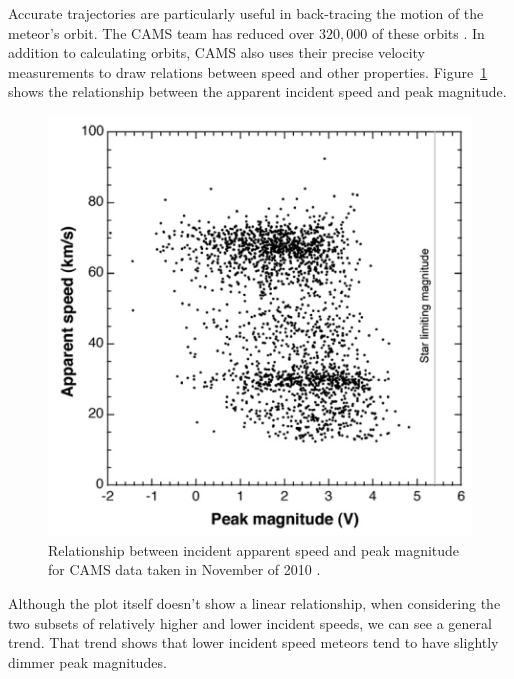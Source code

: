 Accurate trajectories are particularly useful in back-tracing the motion of the meteor's orbit.  
The CAMS team has reduced over $320,000$ of these orbits \cite{noauthor_cameras_nodate}. 
In addition to calculating orbits, CAMS also uses their precise velocity measurements to draw relations between speed and other properties. 
Figure~\ref{fancyCAMS} shows the relationship between the apparent incident speed and peak magnitude.

\begin{figure}[ht!]
  \centering
  \includegraphics[scale=0.6]{images/CAMS_plot.png}
  \caption{Relationship between incident apparent speed and peak magnitude for CAMS data taken in November of 2010 \cite{jenniskens_cams:_2011}.}
  \label{fancyCAMS}
\end{figure}


Although the plot itself doesn't show a linear relationship, when considering the two subsets of relatively higher and lower incident speeds, we can see a general trend.
That trend shows that lower incident speed meteors tend to have slightly dimmer peak magnitudes. 



